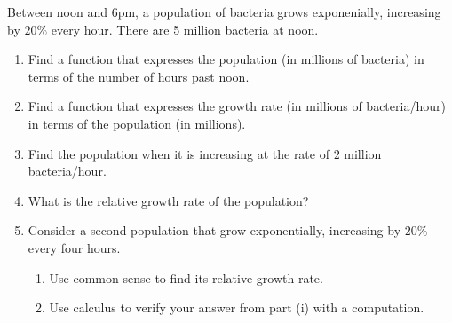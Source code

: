 \documentclass{ximera}
\begin{document}
\begin{question}  \label{Q9deLFLDF}
Between noon and 6pm, a population of bacteria grows exponenially, increasing by $20\%$ every hour. There are 5 million bacteria at noon.

\begin{enumerate}
\item Find a function that expresses the population (in millions of bacteria) in terms of the number of hours past noon.

\item Find a function that expresses the growth rate (in millions of bacteria/hour) in terms of the population (in millions).

\item Find the population when it is increasing at the rate of $2$ million bacteria/hour.

\item What is the relative growth rate of the population?

\item Consider a second population that grow exponentially, increasing by $20\%$ every four hours. 

\begin{enumerate}
\item Use common sense to find its relative growth rate.
\item Use calculus to verify your answer from part (i) with a computation.
\end{enumerate}
\end{enumerate}

\end{question}
\end{document}
